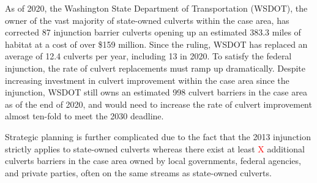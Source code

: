 \documentclass[12pt]{elsarticle}
\begin{document}
As of 2020, the Washington State Department of Transportation (WSDOT), the owner of the vast majority of state-owned culverts within the case area, has corrected 87 injunction barrier culverts opening up an estimated 383.3 miles of habitat at a cost of over \$159 million. Since the ruling, WSDOT has replaced an average of 12.4 culverts per year, including 13 in 2020. To satisfy the federal injunction, the rate of culvert replacements must ramp up dramatically. Despite increasing investment in culvert improvement within the case area since the injunction, WSDOT still owns an estimated 998 culvert barriers in the case area as of the end of 2020, and would need to increase the rate of culvert improvement almost ten-fold to meet the 2030 deadline.  


Strategic planning is further complicated due to the fact that the 2013 injunction strictly applies to state-owned culverts whereas there exist at least \textcolor{red}{X} additional culverts barriers in the case area owned by local governments, federal agencies, and private parties, often on the same streams as state-owned culverts.


\end{document}
